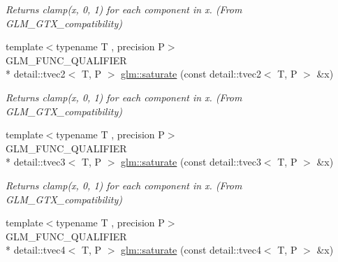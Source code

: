 \begin{DoxyCompactItemize}
\begin{DoxyCompactList}\small\item\em Returns clamp(x, 0, 1) for each component in x. (From G\-L\-M\-\_\-\-G\-T\-X\-\_\-compatibility) \end{DoxyCompactList}\item 
\hypertarget{group__gtx__compatibility_gab7c26da683d068e34feaa3ae90a528c1}{{\footnotesize template$<$typename T , precision P$>$ }\\G\-L\-M\-\_\-\-F\-U\-N\-C\-\_\-\-Q\-U\-A\-L\-I\-F\-I\-E\-R \\*
detail\-::tvec2$<$ T, P $>$ \hyperlink{group__gtx__compatibility_gab7c26da683d068e34feaa3ae90a528c1}{glm\-::saturate} (const detail\-::tvec2$<$ T, P $>$ \&x)}\label{group__gtx__compatibility_gab7c26da683d068e34feaa3ae90a528c1}

\begin{DoxyCompactList}\small\item\em Returns clamp(x, 0, 1) for each component in x. (From G\-L\-M\-\_\-\-G\-T\-X\-\_\-compatibility) \end{DoxyCompactList}\item 
\hypertarget{group__gtx__compatibility_ga367b1adb1d748e156db972cc92b42483}{{\footnotesize template$<$typename T , precision P$>$ }\\G\-L\-M\-\_\-\-F\-U\-N\-C\-\_\-\-Q\-U\-A\-L\-I\-F\-I\-E\-R \\*
detail\-::tvec3$<$ T, P $>$ \hyperlink{group__gtx__compatibility_ga367b1adb1d748e156db972cc92b42483}{glm\-::saturate} (const detail\-::tvec3$<$ T, P $>$ \&x)}\label{group__gtx__compatibility_ga367b1adb1d748e156db972cc92b42483}

\begin{DoxyCompactList}\small\item\em Returns clamp(x, 0, 1) for each component in x. (From G\-L\-M\-\_\-\-G\-T\-X\-\_\-compatibility) \end{DoxyCompactList}\item 
\hypertarget{group__gtx__compatibility_gaad58ab5081f38e91ba5a99a25ba6270c}{{\footnotesize template$<$typename T , precision P$>$ }\\G\-L\-M\-\_\-\-F\-U\-N\-C\-\_\-\-Q\-U\-A\-L\-I\-F\-I\-E\-R \\*
detail\-::tvec4$<$ T, P $>$ \hyperlink{group__gtx__compatibility_gaad58ab5081f38e91ba5a99a25ba6270c}{glm\-::saturate} (const detail\-::tvec4$<$ T, P $>$ \&x)}\label{group__gtx__compatibility_gaad58ab5081f38e91ba5a99a25ba6270c}


\end{DoxyCompactItemize}
